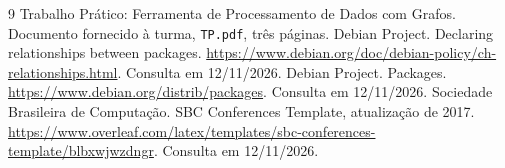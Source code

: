 \documentclass[12pt]{article}
\begin{document}
\begin{thebibliography}{9}
 Trabalho Prático: Ferramenta de Processamento de Dados com Grafos. Documento fornecido à turma, \texttt{TP.pdf}, três páginas.
 Debian Project. Declaring relationships between packages. \url{https://www.debian.org/doc/debian-policy/ch-relationships.html}. Consulta em 12/11/2026.
 Debian Project. Packages. \url{https://www.debian.org/distrib/packages}. Consulta em 12/11/2026.
 Sociedade Brasileira de Computação. SBC Conferences Template, atualização de 2017. \url{https://www.overleaf.com/latex/templates/sbc-conferences-template/blbxwjwzdngr}. Consulta em 12/11/2026.
\end{thebibliography}
\end{document}
